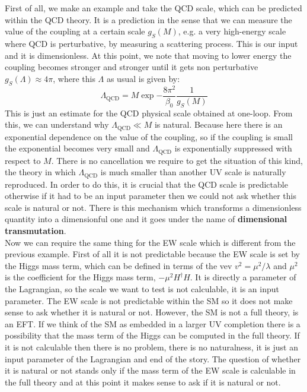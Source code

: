 \documentclass[../main.tex]{subfiles}
\begin{document}
First of all, we make an example and take the QCD scale, which can be predicted within the QCD theory. It is a prediction in the sense that we can measure the value of the coupling at a certain scale $g_S(M)$, e.g. a very high-energy scale where QCD is perturbative, by measuring a scattering process. This is our input and it is dimensionless. At this point, we note that moving to lower energy the coupling becomes stronger and stronger until it gets non perturbative $g_S(\Lambda)\approx4\pi$, where this $\Lambda$ as usual is given by:
\[
\Lambda_{\text{QCD}}=M\exp{-\frac{8\pi^2}{\beta_0}\frac{1}{g_S(M)}}
\]
This is just an estimate for the QCD physical scale obtained at one-loop. From this, we can understand why $\Lambda_{\text{QCD}}\ll M$ is natural. Because here there is an exponential dependence on the value of the coupling, so if the coupling is small the exponential becomes very small and $\Lambda_{\text{QCD}}$ is exponentially suppressed with respect to $M$. There is no cancellation we require to get the situation of this kind, the theory in which $\Lambda_{\text{QCD}}$ is much smaller than another UV scale is naturally reproduced. In order to do this, it is crucial that the QCD scale is predictable otherwise if it had to be an input parameter then we could not ask whether this scale is natural or not. There is this mechanism which transforms a dimensionless quantity into a dimensionful one and it goes under the name of \textbf{dimensional transmutation}.\\
Now we can require the same thing for the EW scale which is different from the previous example. First of all it is not predictable because the EW scale is set by the Higgs mass term, which can be defined in terms of the vev $v^2=\mu^2/\lambda$ and $\mu^2$ is the coefficient for the Higgs mass term, $-\mu^2H^\dagger H$. It is directly a parameter of the Lagrangian, so the scale we want to test is not calculable, it is an input parameter. The EW scale is not predictable within the SM so it does not make sense to ask whether it is natural or not. However, the SM is not a full theory, is an EFT. If we think of the SM as embedded in a larger UV completion there is a possibility that the mass term of the Higgs can be computed in the full theory. If it is not calculable then there is no problem, there is no naturalness, it is just an input parameter of the Lagrangian and end of the story. The question of whether it is natural or not stands only if the mass term of the EW scale is calculable in the full theory and at this point it makes sense to ask if it is natural or not.\\
\end{document}
